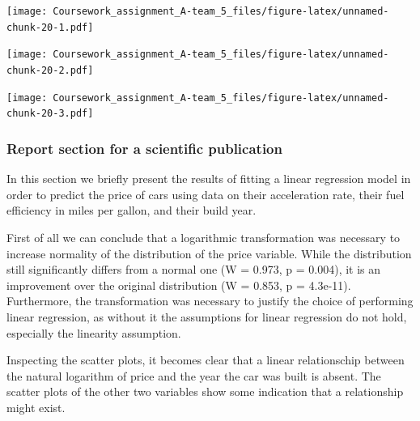 \documentclass[]{article}
\newenvironment{Shaded}{\begin{snugshade}}{\end{snugshade}}
\newcommand{\KeywordTok}[1]{\textcolor[rgb]{0.13,0.29,0.53}{\textbf{#1}}}
\newcommand{\OperatorTok}[1]{\textcolor[rgb]{0.81,0.36,0.00}{\textbf{#1}}}
\newcommand{\NormalTok}[1]{#1}
\begin{document}
\texttt{[image: Coursework\_assignment\_A-team\_5\_files/figure-latex/unnamed-chunk-20-1.pdf]}

\begin{Shaded}
\end{Shaded}

\texttt{[image: Coursework\_assignment\_A-team\_5\_files/figure-latex/unnamed-chunk-20-2.pdf]}

\begin{Shaded}
\end{Shaded}

\texttt{[image: Coursework\_assignment\_A-team\_5\_files/figure-latex/unnamed-chunk-20-3.pdf]}

\subsubsection{Report section for a scientific
publication}\label{report-section-for-a-scientific-publication-2}

In this section we briefly present the results of fitting a linear
regression model in order to predict the price of cars using data on
their acceleration rate, their fuel efficiency in miles per gallon, and
their build year.

First of all we can conclude that a logarithmic transformation was
necessary to increase normality of the distribution of the price
variable. While the distribution still significantly differs from a
normal one (W = 0.973, p = 0.004), it is an improvement over the
original distribution (W = 0.853, p = 4.3e-11). Furthermore, the
transformation was necessary to justify the choice of performing linear
regression, as without it the assumptions for linear regression do not
hold, especially the linearity assumption.

Inspecting the scatter plots, it becomes clear that a linear
relationschip between the natural logarithm of price and the year the
car was built is absent. The scatter plots of the other two variables
show some indication that a relationship might exist.
\end{document}

